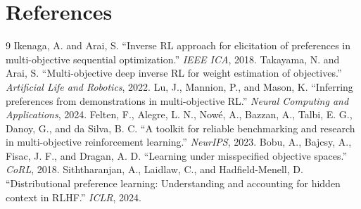 \documentclass[11pt]{article}
\begin{document}
\section*{References}
\begingroup
\renewcommand{\section}[2]{}
\small
\begin{thebibliography}{9}
\setlength{\itemsep}{0pt}
\setlength{\parskip}{0pt}
 Ikenaga, A. and Arai, S. ``Inverse RL approach for elicitation of preferences in multi-objective sequential optimization.'' \emph{IEEE ICA}, 2018.
 Takayama, N. and Arai, S. ``Multi-objective deep inverse RL for weight estimation of objectives.'' \emph{Artificial Life and Robotics}, 2022.
 Lu, J., Mannion, P., and Mason, K. ``Inferring preferences from demonstrations in multi-objective RL.'' \emph{Neural Computing and Applications}, 2024.
 Felten, F., Alegre, L. N., Now\'e, A., Bazzan, A., Talbi, E. G., Danoy, G., and da Silva, B. C. ``A toolkit for reliable benchmarking and research in multi-objective reinforcement learning.'' \emph{NeurIPS}, 2023.
 Bobu, A., Bajcsy, A., Fisac, J. F., and Dragan, A. D. ``Learning under misspecified objective spaces.'' \emph{CoRL}, 2018.
 Siththaranjan, A., Laidlaw, C., and Hadfield-Menell, D. ``Distributional preference learning: Understanding and accounting for hidden context in RLHF.'' \emph{ICLR}, 2024.
\end{thebibliography}
\endgroup

\newpage \newpage 
\end{document}
